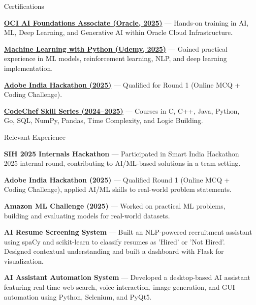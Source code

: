 \documentclass{resume}
\begin{document}
\begin{rSection}{Certifications}

\item \textbf{\href{https://catalog-education.oracle.com/pls/certview/sharebadge?id=719FD170B4B05E469E06593E7B1C2D3E97A4E88D0AA2AFFF78C357C5D80D9C3A}{OCI AI Foundations Associate (Oracle, 2025)}} — Hands-on training in AI, ML, Deep Learning, and Generative AI within Oracle Cloud Infrastructure.

\item \textbf{\href{https://www.udemy.com/certificate/UC-27504e9e-2fd1-49ee-a7e5-4f3ab294f2b4}{Machine Learning with Python (Udemy, 2025)}} — Gained practical experience in ML models, reinforcement learning, NLP, and deep learning implementation.

\item \textbf{\href{https://unstop.com/certificate-preview/aa08da16-c97e-4261-a363-0043d38befc9}{Adobe India Hackathon (2025)}} — Qualified for Round 1 (Online MCQ + Coding Challenge).

\item \textbf{\href{https://www.codechef.com/users/shubh1_234/certificates}{CodeChef Skill Series (2024–2025)}} — Courses in C, C++, Java, Python, Go, SQL, NumPy, Pandas, Time Complexity, and Logic Building.

\end{rSection}


\begin{rSection}{Relevant Experience}

\item \textbf{SIH 2025 Internals Hackathon} — Participated in Smart India Hackathon 2025 internal round, contributing to AI/ML-based solutions in a team setting.

\item \textbf{Adobe India Hackathon (2025)} — Qualified Round 1 (Online MCQ + Coding Challenge), applied AI/ML skills to real-world problem statements.

\item \textbf{Amazon ML Challenge (2025)} — Worked on practical ML problems, building and evaluating models for real-world datasets.

\item \textbf{AI Resume Screening System} — Built an NLP-powered recruitment assistant using spaCy and scikit-learn to classify resumes as 'Hired' or 'Not Hired'. Designed contextual understanding and built a dashboard with Flask for visualization.

\item \textbf{AI Assistant Automation System} — Developed a desktop-based AI assistant featuring real-time web search, voice interaction, image generation, and GUI automation using Python, Selenium, and PyQt5.

\end{rSection}
\end{document}
